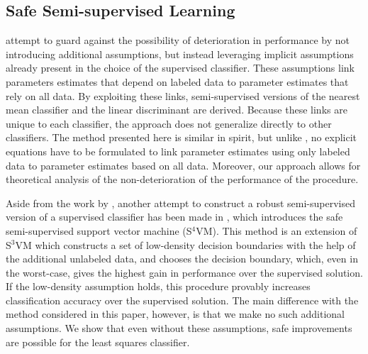 \documentclass{elsarticle}
\begin{document}
\subsection*{Safe Semi-supervised Learning}
\cite{Loog2010,Loog2014b} attempt to guard against the possibility of deterioration in performance by not introducing additional assumptions, but instead leveraging implicit assumptions already present in the choice of the supervised classifier.
These assumptions link parameters estimates that depend on labeled data to parameter estimates that rely on all data. 
By exploiting these links, semi-supervised versions of the nearest mean classifier and the linear discriminant are derived. 
Because these links are unique to each classifier, the approach does not generalize directly to other classifiers. 
The method presented here is similar in spirit, but unlike \cite{Loog2010,Loog2014b}, no explicit equations have to be formulated to link parameter estimates using only labeled data to parameter estimates based on all data. Moreover, our approach allows for theoretical analysis of the non-deterioration of the performance of the procedure.

Aside from the work by \cite{Loog2010,Loog2014b}, another attempt to construct a robust semi-supervised version of a supervised classifier has been made in \cite{Li2011}, which introduces the safe semi-supervised support vector machine (S$^4$VM). 
This method is an extension of S$^3$VM \cite{Bennett1998} which constructs a set of low-density decision boundaries with the help of the additional unlabeled data, and chooses the decision boundary, which, even in the worst-case, gives the highest gain in performance over the supervised solution. 
If the low-density assumption holds, this procedure provably increases classification accuracy over the supervised solution. 
The main difference with the method considered in this paper, however, is that we make no such additional assumptions. We show that even without these assumptions, safe improvements are possible for the least squares classifier.
\end{document}
